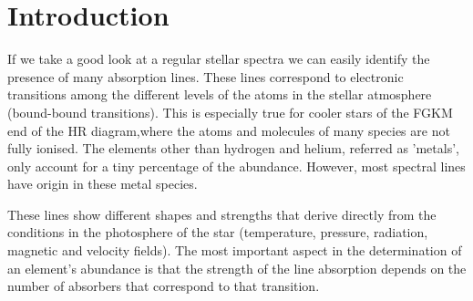 \documentclass[dvips,12pt,a4paper]{report}
\begin{document}
{\section{Introduction}

If we take a good look at a regular stellar spectra we can easily identify the presence of many absorption lines. These lines correspond to electronic transitions among the different levels of the atoms in the stellar atmosphere (bound-bound transitions). This is especially true for cooler stars of the FGKM end of the HR diagram,where the atoms and molecules of many species are not fully ionised. %
The elements other than hydrogen and helium, referred as 'metals', only account for a tiny percentage of the abundance. However, most spectral lines have origin in these metal species.

These lines show different shapes and strengths that derive directly from the conditions in the photosphere of the star (temperature, pressure, radiation, magnetic and velocity fields). %
The most important aspect in the determination of an element's abundance is that the strength of the line absorption depends on the number of absorbers that correspond to that transition.  


}
\end{document}
